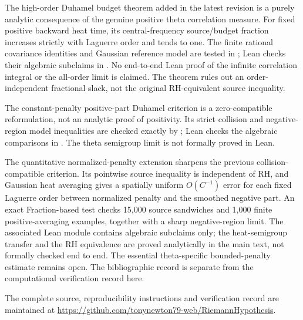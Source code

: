 The high-order Duhamel budget theorem added
in the latest revision is a purely analytic
consequence of the genuine positive theta
correlation measure. For fixed positive
backward heat time, its central-frequency
source/budget fraction increases strictly
with Laguerre order and tends to one.
The finite rational covariance identities
and Gaussian reference model are tested in
;
Lean checks their algebraic subclaims in
.
No end-to-end Lean proof of the infinite
correlation integral or the all-order
limit is claimed. The theorem rules out
an order-independent fractional slack,
not the original RH-equivalent source
inequality.

The constant-penalty positive-part Duhamel criterion is
a zero-compatible reformulation, not an analytic proof
of positivity. Its strict collision and negative-region
model inequalities are checked exactly by
;
Lean checks the algebraic comparisons in
. The theta
semigroup limit is not formally proved in Lean.


The quantitative normalized-penalty extension sharpens the
previous collision-compatible criterion. Its pointwise
source inequality is independent of RH, and Gaussian
heat averaging gives a spatially uniform
$O(C^{-1})$ error for each fixed Laguerre order
between normalized penalty and the smoothed
negative part. An exact Fraction-based test checks
15,000 source sandwiches and 1,000 finite
positive-averaging examples, together with a sharp
negative-region limit. The associated Lean module
contains algebraic subclaims only; the heat-semigroup
transfer and the RH equivalence are proved analytically
in the main text, not formally checked end to end.
The essential theta-specific bounded-penalty
estimate remains open. The bibliographic record is separate from the computational verification record here.

The complete source, reproducibility
instructions and verification record
are maintained at
\url{https://github.com/tonynewton79-web/RiemannHypothesis}.


